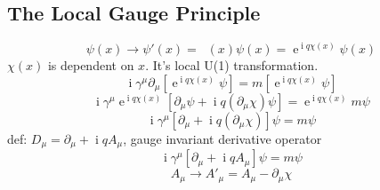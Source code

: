 \documentclass[a4paper]{article}
\DeclareMathOperator{\e}{\mathrm{e}}
\DeclareMathOperator{\I}{\mathrm{i}}
\DeclareMathOperator{\ra}{\rightarrow}
\DeclareMathOperator{\hU}{\hat{U}}
\numberwithin{equation}{section}
\begin{document}
\subsection{The Local Gauge Principle}
\begin{equation}\label{key}
\psi(x) \ra \psi'(x) = \hU(x)\psi(x) = \e^{\I q\chi(x)}\psi(x)
\end{equation}
$ \chi(x) $ is dependent on $ x $. It's local U(1) transformation.
\begin{equation}\label{key}
\I\gamma^\mu\partial_\mu [\e^{\I q\chi(x)}\psi] = m[\e^{\I q\chi(x)}\psi]
\end{equation}
\begin{equation}\label{key}
\I\gamma^\mu\e^{\I q\chi(x)}[\partial_\mu \psi + \I q(\partial_\mu \chi) \psi] = \e^{\I q\chi(x)} m\psi
\end{equation}
\begin{equation}\label{key}
\I\gamma^\mu [\partial_\mu + \I q(\partial_\mu \chi)] \psi = m\psi
\end{equation}
def: $ D_\mu = \partial_\mu + \I q A_\mu $, gauge invariant derivative operator
\begin{equation}\label{key}
\I\gamma^\mu [\partial_\mu + \I q A_\mu] \psi = m\psi
\end{equation}
\begin{equation}\label{key}
A_\mu \ra A'_\mu = A_\mu - \partial_\mu \chi
\end{equation}
\end{document}

